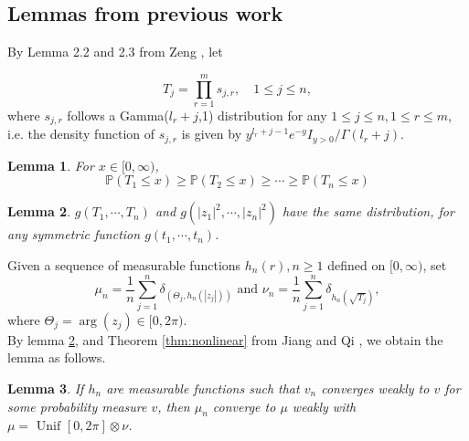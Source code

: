 \documentclass[12pt]{article}
\theoremstyle{plain}
\newtheorem{lem}{\textbf{Lemma}}
\theoremstyle{definition}
\theoremstyle{remark}
\begin{document}
\subsection{Lemmas from previous work} 
By Lemma 2.2 and 2.3 from Zeng \cite{zeng2017}, let 

\begin{equation*}
T_{j}=\prod_{r=1}^{m} s_{j, r}, \quad 1 \leq j \leq n, 
\end{equation*}
where $s_{j,r}$ follows a Gamma($l_r+j$,1) distribution for any $1 \leq j \leq n, 1 \leq r \leq m$, i.e. the density function of $s_{j,r}$ is given by $y^{l_{r}+j-1} e^{-y} I_{y>0} / \Gamma\left(l_{r}+j\right)$.\\



\begin{lem}\label{lem: Zeng 2017   lem 2.3}\cite{zeng2017}
For $x \in[0, \infty)$, 
\begin{equation*}
\mathbb{P}\left(T_{1} \leq x\right) \geq \mathbb{P}\left(T_{2} \leq x\right) \geq \cdots   \geq \mathbb{P}\left(T_{n} \leq x\right)
\end{equation*}
\end{lem}
\begin{lem}\label{lem: Zeng2017 Lemma 2.2}\cite{zeng2017}
$g\left(T_{1}, \cdots, T_{n}\right)$ and $g\left(\left|z_{1}\right|^{2}, \cdots,\left|z_{n}\right|^{2}\right)$ have the same distribution, for any symmetric function $g(t_1,\cdots,t_n)$.
\end{lem}

Given a sequence of measurable functions $h_{n}(r), n\geq 1$ defined on $[0, \infty)$, set
\begin{equation*}
\mu_{n}=\frac{1}{n} \sum_{j=1}^{n} \delta_{\left(\Theta_{j}, h_{n}\left(\left|z_{j}\right|\right)\right)} \text { and } \nu_{n}=\frac{1}{n} \sum_{j=1}^{n} \delta_{h_{n}\left(\sqrt{T_{j}}\right)},
\end{equation*}
where $\Theta_{j}=\arg \left(z_{j}\right) \in[0,2 \pi)$.\\


By lemma  \ref{lem: Zeng2017 Lemma 2.2}, and Theorem \ref{thm:nonlinear} from Jiang and Qi \cite{JiangQi2019}, we obtain the lemma as follows. 
\begin{lem}\label{lem: Zeng 2017   lem ?}
If {$h_n$} are measurable functions such that  $v_{n}$ converges weakly to $v$ for some probability measure $v$, then $\mu_{n}$ converge to $\mu$ weakly with $\mu=\text { Unif }[0,2 \pi] \otimes \nu$. 
\end{lem}
\end{document}
